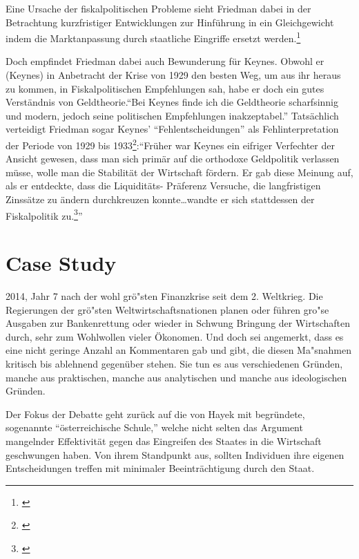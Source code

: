 \documentclass[
        onecolumn,
        a4paper,
        abstracton,
        parskip=half
        ,final
        ]{scrartcl}
\begin{document}
Eine Ursache der fiskalpolitischen Probleme sieht Friedman dabei in der Betrachtung kurzfristiger Entwicklungen zur Hinf{\"u}hrung in ein Gleichgewicht indem die Marktanpassung durch staatliche Eingriffe ersetzt werden.\footnote[802]{\citep*[S.127]{friedman1970die}}

Doch empfindet Friedman dabei auch Bewunderung f{\"u}r Keynes. Obwohl er (Keynes) in Anbetracht der Krise von 1929 den besten Weg,
um aus ihr heraus zu kommen, in Fiskalpolitischen Empfehlungen sah, habe er doch ein gutes
Verst{\"a}ndnis von Geldtheorie."`Bei Keynes finde ich die Geldtheorie scharfsinnig und
modern, jedoch seine politischen Empfehlungen inakzeptabel."' Tats{\"a}chlich verteidigt
Friedman sogar Keynes' "`Fehlentscheidungen"' als Fehlinterpretation der Periode von 1929
bis 1933\footnote[803]{\citep*[S.121]{friedman1970die}}:"`Fr{\"u}her war Keynes ein eifriger Verfechter der Ansicht gewesen, dass man sich
prim{\"a}r auf die orthodoxe Geldpolitik verlassen m{\"u}sse, wolle man die Stabilit{\"a}t der
Wirtschaft f{\"o}rdern. Er gab diese Meinung auf, als er entdeckte, dass die Liquidit{\"a}ts-
Pr{\"a}ferenz Versuche, die langfristigen Zinss{\"a}tze zu {\"a}ndern durchkreuzen konnte\ldots wandte er
sich stattdessen der Fiskalpolitik zu.\footnote[804]{\citep*[S.126]{friedman1970die}}"'


\clearpage
\section{Case Study} %
\label{sec4:CaseStudy}
2014, Jahr 7 nach der wohl gr{\"o}{"s}ten Finanzkrise seit dem 2. Weltkrieg. Die Regierungen der gr{\"o}{"s}ten Weltwirtschaftsnationen planen oder f{\"u}hren gro{"s}e Ausgaben zur Bankenrettung oder wieder in Schwung Bringung der Wirtschaften durch, sehr zum Wohlwollen vieler {\"O}konomen. Und doch sei angemerkt, dass es eine nicht geringe Anzahl an Kommentaren gab und gibt, die diesen Ma{"s}nahmen kritisch bis ablehnend gegen{\"u}ber stehen. Sie tun es aus verschiedenen Gr{\"u}nden, manche aus praktischen, manche aus analytischen und manche aus ideologischen Gr{\"u}nden.

Der Fokus der Debatte geht zur{\"u}ck auf die von Hayek mit begr{\"u}ndete, sogenannte "`{\"o}sterreichische Schule,"' welche nicht selten das Argument mangelnder Effektivit{\"a}t gegen das Eingreifen des Staates in die Wirtschaft geschwungen haben. Von ihrem Standpunkt aus, sollten Individuen ihre eigenen Entscheidungen treffen mit minimaler Beeintr{\"a}chtigung durch den Staat.
\end{document}
